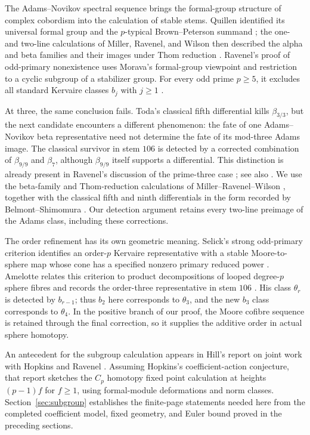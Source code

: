 The Adams--Novikov spectral sequence brings the formal-group structure of complex cobordism into the calculation of stable stems. Quillen identified its universal formal group and the $p$-typical Brown--Peterson summand \cite{Quillen}; the one- and two-line calculations of Miller, Ravenel, and Wilson then described the alpha and beta families and their images under Thom reduction \cite{MRW}. Ravenel's proof of odd-primary nonexistence uses Morava's formal-group viewpoint and restriction to a cyclic subgroup of a stabilizer group. For every odd prime $p\geq5$, it excludes all standard Kervaire classes $b_j$ with $j\geq1$ \cite[Theorem~17]{Ravenel1978}.

At three, the same conclusion fails. Toda's classical fifth differential kills $\beta_{3/3}$, but the next candidate encounters a different phenomenon: the fate of one Adams--Novikov beta representative need not determine the fate of its mod-three Adams image. The classical survivor in stem $106$ is detected by a corrected combination of $\beta_{9/9}$ and $\beta_7$, although $\beta_{9/9}$ itself supports a differential. This distinction is already present in Ravenel's discussion of the prime-three case \cite{Ravenel1978}; see also \cite[Theorem~3.4.4(c) and the discussion after Proposition~6.4.11]{Ravenel}. We use the beta-family and Thom-reduction calculations of Miller--Ravenel--Wilson \cite[Theorems~2.2, 2.6, and~9.4]{MRW}, together with the classical fifth and ninth differentials in the form recorded by Belmont--Shimomura \cite[Lemma~2.5]{BelmontShimomura}. Our detection argument retains every two-line preimage of the Adams class, including these corrections.

The order refinement has its own geometric meaning. Selick's strong odd-primary criterion identifies an order-$p$ Kervaire representative with a stable Moore-to-sphere map whose cone has a specified nonzero primary reduced power \cite{Selick}. Amelotte relates this criterion to product decompositions of looped degree-$p$ sphere fibres and records the order-three representative in stem $106$ \cite[Theorem~1.1 and the proof of Corollary~1.2]{Amelotte}. His class $\theta_r$ is detected by $b_{r-1}$; thus $b_2$ here corresponds to $\theta_3$, and the new $b_3$ class corresponds to $\theta_4$. In the positive branch of our proof, the Moore cofibre sequence is retained through the final correction, so it supplies the additive order in actual sphere homotopy.

An antecedent for the subgroup calculation appears in Hill's report on joint work with Hopkins and Ravenel \cite[Conjecture~1 and Propositions~2--3]{Hill2007}. Assuming Hopkins's coefficient-action conjecture, that report sketches the $C_p$ homotopy fixed point calculation at heights $(p-1)f$ for $f\geq1$, using formal-module deformations and norm classes. Section~\ref{sec:subgroup} establishes the finite-page statements needed here from the completed coefficient model, fixed geometry, and Euler bound proved in the preceding sections.

